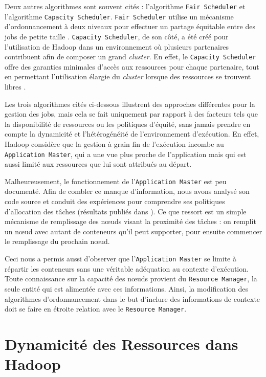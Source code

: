 Deux autres algorithmes sont souvent cités : l'algorithme \texttt{Fair Scheduler} et l'algorithme \texttt{Capacity Scheduler}. \texttt{Fair Scheduler} utilise un mécanisme d'ordonnancement à deux niveaux pour effectuer un partage équitable entre des jobs de petite taille \cite{Hadoop}. \texttt{Capacity Scheduler}, de son côté, a été créé pour l'utilisation de Hadoop dans un environnement où plusieurs partenaires contribuent afin de composer un grand \textit{cluster}. En effet, le \texttt{Capacity Scheduler} offre des garanties minimales d'accès aux ressources pour chaque partenaire, tout en permettant l'utilisation élargie du \textit{cluster} lorsque des ressources se trouvent libres \cite{Hadoop}.

Les trois algorithmes cités ci-dessous illustrent des approches différentes pour la gestion des jobs, mais cela se fait uniquement par rapport à des facteurs tels que la disponibilité de ressources ou les politiques d'équité, sans jamais prendre en compte la dynamicité et l'hétérogénéité de l'environnement d'exécution. En effet, Hadoop considère que la gestion à grain fin de l'exécution incombe au  \texttt{Application Master}, qui a une vue plus proche de l'application mais qui est aussi limité aux ressources que lui sont attribués au départ.

Malheureusement, le fonctionnement de l'\texttt{Application Master} est peu documenté. Afin de combler ce manque d'information, nous avons analysé son code source et conduit des expériences pour comprendre ses politiques d'allocation des tâches (résultats publiés dans \cite{UBICOMM2014}). Ce que ressort est un simple mécanisme de remplissage des n{\oe}uds visant la proximité des tâches : on remplit un n{\oe}ud avec autant de conteneurs qu'il peut supporter, pour ensuite commencer le remplissage du prochain n{\oe}ud.   

Ceci nous a permis aussi d'observer que l'\texttt{Application Master} se limite à répartir les conteneurs sans une véritable adéquation au contexte d'exécution. Toute connaissance sur la capacité des n{\oe}uds provient du \texttt{Resource Manager}, la seule entité qui est alimentée avec ces informations. Ainsi, la modification des algorithmes d'ordonnancement dans le but d'inclure des informations de contexte doit se faire en étroite relation avec le \texttt{Resource Manager}.



\section{Dynamicité des Ressources dans Hadoop} \label{sec:related}

